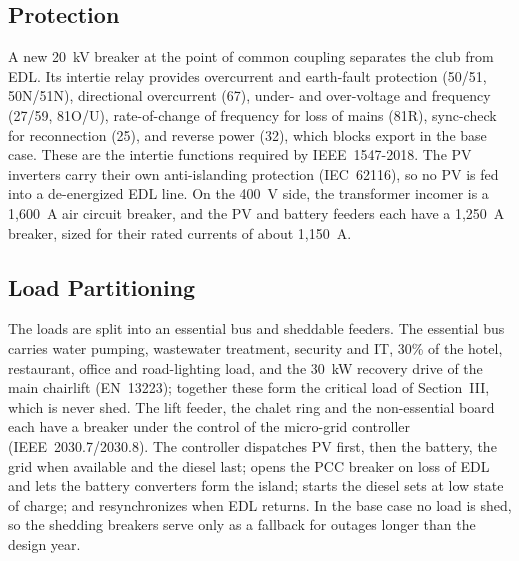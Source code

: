 \subsection{Protection}
A new 20~kV breaker at the point of common coupling separates the club from EDL. Its intertie relay
provides overcurrent and earth-fault protection (50/51, 50N/51N), directional overcurrent (67),
under- and over-voltage and frequency (27/59, 81O/U), rate-of-change of frequency for loss of mains
(81R), sync-check for reconnection (25), and reverse power (32), which blocks export in the base case.
These are the intertie functions required by IEEE~1547-2018. The PV inverters carry their own
anti-islanding protection (IEC~62116), so no PV is fed into a de-energized EDL line. On the 400~V
side, the transformer incomer is a 1,600~A air circuit breaker, and the PV and battery feeders each
have a 1,250~A breaker, sized for their rated currents of about 1,150~A.

\subsection{Load Partitioning}
The loads are split into an essential bus and sheddable feeders. The essential bus carries water
pumping, wastewater treatment, security and IT, 30\% of the hotel, restaurant, office and road-lighting
load, and the 30~kW recovery drive of the main chairlift (EN~13223); together these form the critical
load of Section~III, which is never shed. The lift feeder, the chalet ring and the non-essential
board each have a breaker under the control of the micro-grid controller (IEEE~2030.7/2030.8). The
controller dispatches PV first, then the battery, the grid when available and the diesel last; opens
the PCC breaker on loss of EDL and lets the battery converters form the island; starts the diesel sets
at low state of charge; and resynchronizes when EDL returns. In the base case no load is shed, so the
shedding breakers serve only as a fallback for outages longer than the design year.
